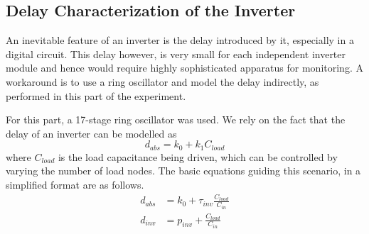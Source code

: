 \documentclass[a4paper, 11pt]{article}
\begin{document}
\subsection{Delay Characterization of the Inverter}
An inevitable feature of an inverter is the delay introduced by it, especially in a digital circuit. This delay however, is very small for each independent inverter module and hence would require highly sophisticated apparatus for monitoring. A workaround is to use a ring oscillator and model the delay indirectly, as performed in this part of the experiment.\par
For this part, a 17-stage ring oscillator was used. We rely on the fact that the delay of an inverter can be modelled as $$
d_{abs} = k_0 + k_1C_{load}
$$ where $C_{load}$ is the load capacitance being driven, which can be controlled by varying the number of load nodes. The basic equations guiding this scenario, in a simplified format are as follows.
\begin{equation*}
\begin{split}
d_{abs} &= k_0 + \tau_{inv}\frac{C_{load}}{C_{in}} \\
d_{inv} &= p_{inv} + \frac{C_{load}}{C_{in}}
\end{split}
\end{equation*}
\vspace*{3.5em}
\end{document}
